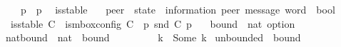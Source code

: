\begin{isabellebody}
\ \ {\isachardoublequoteopen}{\isasymC}\isactrlsub {\isasymI}\isactrlsub {\isasymmm}\ {\isasymequiv}\ {\isasymlambda}p{\isachardot}{\kern0pt}\ {\isacharparenleft}{\kern0pt}{\isasymI}\ p{\isacharcomma}{\kern0pt}\ {\isasymepsilon}{\isacharparenright}{\kern0pt}{\isachardoublequoteclose}\isanewline
\isanewline
{}\isamarkupfalse%
\ is{\isacharunderscore}{\kern0pt}stable\isanewline
\ \ {\isacharcolon}{\kern0pt}{\isacharcolon}{\kern0pt}\ {\isachardoublequoteopen}{\isacharparenleft}{\kern0pt}{\isacharprime}{\kern0pt}peer\ {\isasymRightarrow}\ {\isacharparenleft}{\kern0pt}{\isacharprime}{\kern0pt}state\ {\isasymtimes}\ {\isacharparenleft}{\kern0pt}{\isacharprime}{\kern0pt}information{\isacharcomma}{\kern0pt}\ {\isacharprime}{\kern0pt}peer{\isacharparenright}{\kern0pt}\ message\ word{\isacharparenright}{\kern0pt}{\isacharparenright}{\kern0pt}\ {\isasymRightarrow}\ bool{\isachardoublequoteclose}\ \isanewline
\ \ {\isachardoublequoteopen}is{\isacharunderscore}{\kern0pt}stable\ C\ {\isasymequiv}\ is{\isacharunderscore}{\kern0pt}mbox{\isacharunderscore}{\kern0pt}config\ C\ {\isasymand}\ {\isacharparenleft}{\kern0pt}{\isasymforall}p{\isachardot}{\kern0pt}\ snd\ {\isacharparenleft}{\kern0pt}C\ p{\isacharparenright}{\kern0pt}\ {\isacharequal}{\kern0pt}\ {\isasymepsilon}{\isacharparenright}{\kern0pt}{\isachardoublequoteclose}\isanewline
\isanewline
{}\isamarkupfalse%
\ bound\ {\isacharequal}{\kern0pt}\ {\isachardoublequoteopen}nat\ option{\isachardoublequoteclose}\isanewline
\isanewline
{}\isamarkupfalse%
\ nat{\isacharunderscore}{\kern0pt}bound\ {\isacharcolon}{\kern0pt}{\isacharcolon}{\kern0pt}\ {\isachardoublequoteopen}nat\ {\isasymRightarrow}\ bound{\isachardoublequoteclose}\ \ {\isacharparenleft}{\kern0pt}{\isachardoublequoteopen}{\isasymB}\ {\isacharunderscore}{\kern0pt}{\isachardoublequoteclose}\ {\isacharbrackleft}{\kern0pt}{}{}{\isacharbrackright}{\kern0pt}\ {}{}{}{\isacharparenright}{\kern0pt}\ \isanewline
\ \ {\isachardoublequoteopen}{\isasymB}\ k\ {\isasymequiv}\ Some\ k{\isachardoublequoteclose}\isanewline
\isanewline
{}\isamarkupfalse%
\ unbounded\ {\isacharcolon}{\kern0pt}{\isacharcolon}{\kern0pt}\ {\isachardoublequoteopen}bound{\isachardoublequoteclose}\ \ {\isacharparenleft}{\kern0pt}{\isachardoublequoteopen}{\isasyminfinity}{\isachardoublequoteclose}\ {}{}{}{\isacharparenright}{\kern0pt}\ \isanewline

\end{isabellebody}

